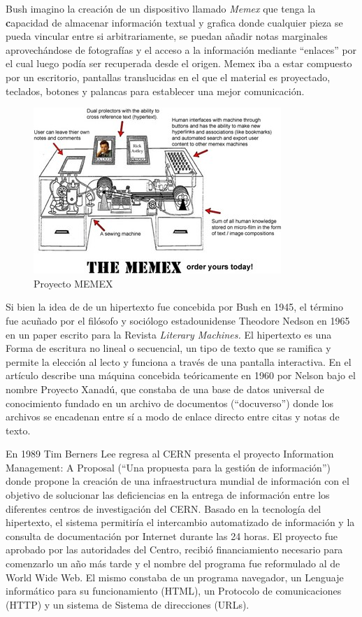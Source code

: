 \documentclass[
  letterpaper,
  DIV=11,
  numbers=noendperiod]{scrreprt}
\begin{document}
Bush imagino la creación de un dispositivo llamado \emph{Memex} que
tenga la \textbf{c}apacidad de almacenar información textual y grafica
donde cualquier pieza se pueda vincular entre si arbitrariamente, se
puedan añadir notas marginales aprovechándose de fotografías y el acceso
a la información mediante ``enlaces'' por el cual luego podía ser
recuperada desde el origen. Memex iba a estar compuesto por un
escritorio, pantallas translucidas en el que el material es proyectado,
teclados, botones y palancas para establecer una mejor comunicación.

\begin{figure}[H]

{\centering \includegraphics{images_2_cap/7-proyecto-MEMEX.jpg}

}

\caption{Proyecto MEMEX}

\end{figure}%

Si bien la idea de de un hipertexto fue concebida por Bush en 1945, el
término fue acuñado por el filósofo y sociólogo estadounidense Theodore
Nedson en 1965 en un paper escrito para la Revista \emph{Literary
Machines.} El hipertexto es una Forma de escritura no lineal o
secuencial, un tipo de texto que se ramifica y permite la elección al
lecto y funciona a través de una pantalla interactiva. En el artículo
describe una máquina concebida teóricamente en 1960 por Nelson bajo el
nombre Proyecto Xanadú, que constaba de una base de datos universal de
conocimiento fundado en un archivo de documentos (``docuverso'') donde
los archivos se encadenan entre sí a modo de enlace directo entre citas
y notas de texto.

En 1989 Tim Berners Lee regresa al CERN presenta el proyecto Information
Management: A Proposal (``Una propuesta para la gestión de
información'') donde propone la creación de una infraestructura mundial
de información con el objetivo de solucionar las deficiencias en la
entrega de información entre los diferentes centros de investigación del
CERN. Basado en la tecnología del hipertexto, el sistema permitiría el
intercambio automatizado de información y la consulta de documentación
por Internet durante las 24 horas. El proyecto fue aprobado por las
autoridades del Centro, recibió financiamiento necesario para comenzarlo
un año más tarde y el nombre del programa fue reformulado al de World
Wide Web. El mismo constaba de un programa navegador, un Lenguaje
informático para su funcionamiento (HTML), un Protocolo de
comunicaciones (HTTP) y un sistema de Sistema de direcciones (URLs).
\end{document}
